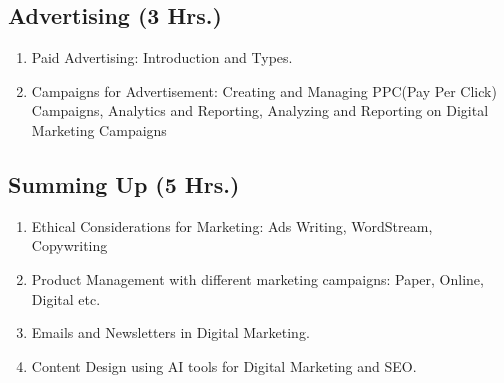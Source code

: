 \subsection{Advertising \hfill (3 Hrs.)}
\begin{enumerate}
    \item Paid Advertising: Introduction and Types.
    \item Campaigns for Advertisement: Creating and Managing PPC(Pay Per Click) Campaigns, Analytics and Reporting, Analyzing and Reporting on Digital Marketing Campaigns
\end{enumerate}

\subsection{Summing Up \hfill (5 Hrs.)}
\begin{enumerate}
    \item Ethical Considerations for Marketing: Ads Writing, WordStream, Copywriting
    \item Product Management with different marketing campaigns: Paper, Online, Digital etc.
    \item Emails and Newsletters in Digital Marketing.
    \item Content Design using AI tools for Digital Marketing and SEO.
\end{enumerate}